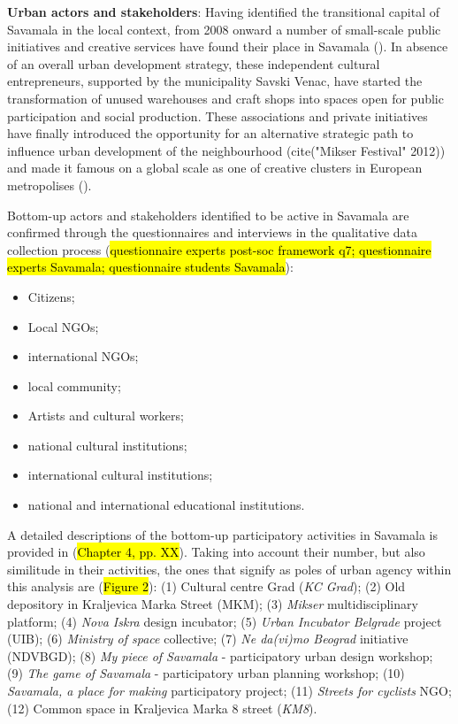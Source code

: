 \documentclass[11pt]{report}
\begin{document}
\begin{itemize}
\textbf{Urban actors and stakeholders}:
Having identified the transitional capital of Savamala in the local context, from 2008 onward a number of small-scale public initiatives and creative services have found their place in Savamala (\cite{(Cvetinovic et al. 2013)}).
In absence of an overall urban development strategy, these independent cultural entrepreneurs, supported by the municipality Savski Venac, have started the transformation of unused warehouses and craft shops into spaces open for public participation and social production.
These associations and private initiatives have finally introduced the opportunity for an alternative strategic path to influence urban development of the neighbourhood (cite{("Mikser Festival" 2012)}) and made it famous on a global scale as one of creative clusters in European metropolises (\cite{ref Monocle, Gardian?}).

Bottom-up actors and stakeholders identified to be active in Savamala are confirmed through the questionnaires and interviews in the qualitative data collection process (\hl{questionnaire experts post-soc framework q7; questionnaire experts Savamala; questionnaire students Savamala}):
\begin{itemize}
\item Citizens;
\item Local NGOs;
\item international NGOs;
\item local community;
\item Artists and cultural workers;
\item national cultural institutions;
\item international cultural institutions;
\item national and international educational institutions.
\end{itemize}

A detailed descriptions of the bottom-up participatory activities in Savamala is provided in (\hl{Chapter 4, pp. XX}).
Taking into account their number, but also similitude in their activities, the ones that signify as poles of urban agency within this analysis are (\hl{Figure 2}): 
(1) Cultural centre Grad (\textit{KC Grad});
(2) Old depository in Kraljevica Marka Street (MKM);
(3) \textit{Mikser} multidisciplinary platform;
(4) \textit{Nova Iskra} design incubator;
(5) \textit{Urban Incubator Belgrade} project (UIB);
(6) \textit{Ministry of space} collective;
(7) \textit{Ne da(vi)mo Beograd} initiative (NDVBGD);
(8) \textit{My piece of Savamala} - participatory urban design workshop;
(9) \textit{The game of Savamala} - participatory urban planning workshop;
(10) \textit{Savamala, a place for making} participatory project;
(11) \textit{Streets for cyclists} NGO;
(12) Common space in Kraljevica Marka 8 street (\textit{KM8}).
\\


\end{itemize}
\end{document}
